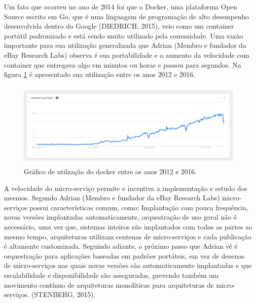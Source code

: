 Um fato que ocorreu no ano de 2014 foi que o Docker, uma plataforma Open Source escrito em Go, que é uma linguagem de programação de alto desempenho desenvolvida dentro do Google (DIEDRICH, 2015), veio como um container portátil padronizado e está sendo muito utilizado pela comunidade. Uma razão importante para sua utilização generalizada que Adrian (Membro e fundador da eBay Research Labs)  observa é sua portabilidade e o aumento da velocidade com container que entregava algo em minutos ou horas e passou para segundos. Na figura \ref{fig:utilizacao-docker} é apresentado sua utilização entre os anos 2012 e 2016.



\begin{figure}[h]
\centering
\includegraphics[height=4.2cm]{imagens/docker}
\caption{Gráfico de utilzação do docker entre os anos 2012 e 2016.}
\label{fig:utilizacao-docker}
\end{figure}

A velocidade do micro-serviço permite e incentiva a implementação e estudo dos mesmos. Segundo Adrian (Membro e fundador da eBay Research Labs)  micro-serviços possui características comum, como: Implantação com pouca frequência, novas versões implantadas automaticamente, orquestração de uso geral não é necessário, uma vez que, sistemas inteiros são implantados com todas as partes ao mesmo tempo, arquiteturas utilizam centenas de micro-serviços e cada publicação é altamente customizada.
Seguindo adiante, o próximo passo que Adrian vê é orquestração para aplicações baseadas em padrões portáteis, em vez de dezenas de micro-serviços nas quais novas versões são automaticamente implantadas e que escalabilidade e disponibilidade são asseguradas, prevendo também um movimento contínuo de arquiteturas monolíticas para arquiteturas de micro-serviços. (STENBERG, 2015).

